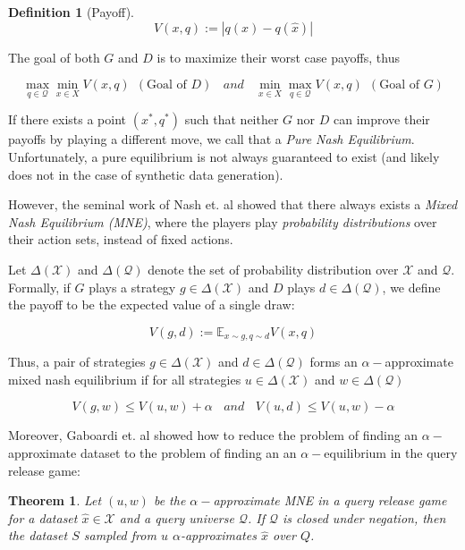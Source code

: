 \documentclass[]{article}
\newcommand{\X}{\mathcal{X}}
\newcommand{\Q}{\mathcal{Q}}
\newtheorem{definition}{Definition}
\newtheorem{theorem}{Theorem}
\begin{document}
\begin{definition}[Payoff]
    \begin{equation}
        V(x,q) := |q(x) - q(\hat x)|
    \end{equation}
\end{definition}

The goal of both $G$ and $D$ is to maximize their worst case payoffs, thus

\begin{equation}
    \max_{q \in \Q} \min_{x \in X} V(x,q) ~~ (\text{Goal of } D) ~~~~ and ~~~~ 
    \min_{x \in X} \max_{q \in \Q} V(x,q) ~~ (\text{Goal of } G) 
\end{equation}

If there exists a point $(x^*, q^*)$ such that neither $G$ nor $D$ can improve their payoffs by playing a different move, we call that a \emph{Pure Nash Equilibrium}. Unfortunately, a pure equilibrium is not always guaranteed to exist (and likely does not in the case of synthetic data generation). 

However, the seminal work of Nash et. al showed that there always exists a \emph{Mixed Nash Equilibrium (MNE)}, where the players play \emph{probability distributions} over their action sets, instead of fixed actions. 

Let $\Delta(\X)$ and $\Delta(\Q)$ denote the set of probability distribution over $\X$ and $\Q$. Formally, if $G$ plays a strategy $g \in \Delta(\X)$ and $D$ plays  $d \in \Delta(\Q)$, we define the payoff to be the expected value of a single draw:

\begin{equation}
    V(g,d) := \mathbb{E}_{x \sim g, q \sim d} V(x,q)
\end{equation}

Thus, a pair of strategies $g \in \Delta(\X)$ and $d \in \Delta(\Q)$ forms an $\alpha-$approximate mixed nash equilibrium if for all strategies $u \in \Delta(\X)$ and $w \in \Delta(\Q)$

\begin{equation}
    V(g, w) \leq V(u,w) + \alpha ~~~~ and ~~~~ V(u, d) \leq V(u,w) - \alpha 
\end{equation}

Moreover, Gaboardi et. al showed how to reduce the problem of finding an $\alpha-$approximate dataset to the problem of finding an an $\alpha-$equilibrium in the query release game:

\begin{theorem}
    Let $(u,w)$ be the $\alpha-$approximate MNE in a query release game for a dataset $\hat x \in \X$ and a query universe $\Q$. If $\Q$ is closed under negation, then the dataset $S$ sampled from $u$ $\alpha$-approximates $\hat x$ over $Q$. \cite{GAH+14}
\end{theorem}
\end{document}

